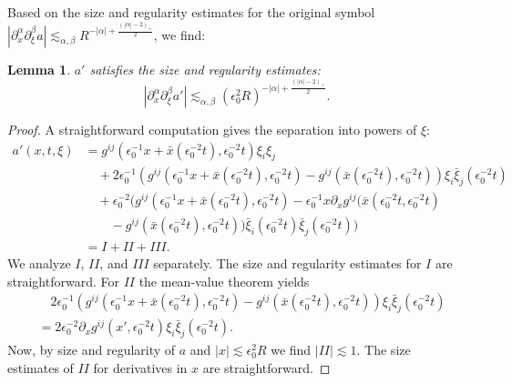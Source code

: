 \documentclass{amsart}
\newtheorem{lemma}[theorem]{Lemma}
\theoremstyle{definition}
\begin{document}
Based on the size and regularity estimates for the original symbol $|\partial_x^{\alpha} \partial_{\xi}^{\beta} a| \lesssim_{\alpha,\beta} R^{-|\alpha| + \frac{(|\alpha|-2)_+}{2}}$, we find:
\begin{lemma}
$a'$ satisfies the size and regularity estimates:
\begin{equation}
\label{eq:SizeRegularityRescaled}
|\partial_x^{\alpha} \partial_{\xi}^{\beta} a'| \lesssim_{\alpha,\beta} (\epsilon_0^2 R)^{-|\alpha|+\frac{(|\alpha|-2)_+}{2}}.
\end{equation}
\end{lemma}
\begin{proof}
A straightforward computation gives the separation into powers of $\xi$:
\begin{equation}
\label{eq:DecompositionSymbol}
\begin{split}
a'(x,t,\xi) &= g^{ij}(\epsilon_0^{-1} x + \bar{x}(\epsilon_0^{-2} t), \epsilon_0^{-2} t) \xi_i \xi_j \\
&\quad + 2 \epsilon_0^{-1} (g^{ij}(\epsilon_0^{-1} x+ \bar{x}(\epsilon_0^{-2} t),\epsilon_0^{-2} t) - g^{ij}(\bar{x}(\epsilon_0^{-2} t),\epsilon_0^{-2} t)) \xi_i \bar{\xi}_j(\epsilon_0^{-2} t) \\
&\quad + \epsilon_0^{-2} (g^{ij}(\epsilon_0^{-1} x + \bar{x}(\epsilon_0^{-2} t),\epsilon_0^{-2} t) - \epsilon_0^{-1} x \partial_x g^{ij}(\bar{x}(\epsilon_0^{-2} t, \epsilon_0^{-2} t) \\
&\quad \quad - g^{ij}(\bar{x}(\epsilon_0^{-2} t),\epsilon_0^{-2} t)) \bar{\xi}_i(\epsilon_0^{-2} t) \bar{\xi}_j(\epsilon_0^{-2} t)) \\
&= I + II + III.
\end{split}
\end{equation}
We analyze $I$, $II$, and $III$ separately. The size and regularity estimates for $I$ are straightforward. For $II$ the mean-value theorem yields
\begin{equation*}
\begin{split}
&\quad 2 \epsilon_0^{-1} (g^{ij}(\epsilon_0^{-1} x+ \bar{x}(\epsilon_0^{-2} t),\epsilon_0^{-2} t) - g^{ij}(\bar{x}(\epsilon_0^{-2} t),\epsilon_0^{-2} t)) \xi_i \bar{\xi}_j(\epsilon_0^{-2} t) \\
&= 2 \epsilon_0^{-2} \partial_x g^{ij}(x',\epsilon_0^{-2} t) \xi_i \bar{\xi}_j(\epsilon_0^{-2} t).
\end{split}
\end{equation*}
Now, by size and regularity of $a$ and $|x| \lesssim \epsilon_0^2 R$ we find $|II| \lesssim 1$. The size estimates of $II$ for derivatives in $x$ are straightforward. 


\end{proof}
\end{document}
